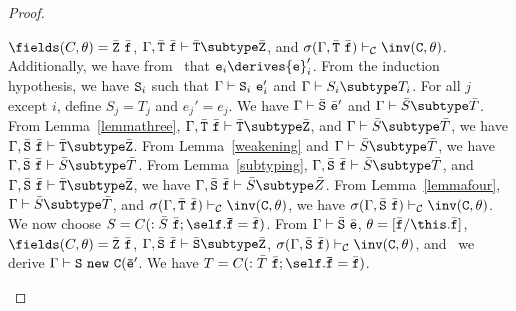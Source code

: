 \begin{proof}
\begin{itemize}
\begin{itemize}
            $\fields(C,\theta)=\bar{\tt Z}\ \bar{\tt f}$,
            $\Gamma, \bar{\tt T}\ \bar{\tt f} \vdash 
                    \bar{\tt T} \subtype \bar{\tt Z}$, and 
            $\sigma(\Gamma, \bar{\tt T}\ \bar{\tt f}) \vdash_{\cal C} 
                    \inv({\tt C},\theta)$.
            Additionally, we have from \RCNewArg\ that
            ${\tt e}_i \derives {{\tt e}}_i'$.
            From the induction hypothesis, we have ${\tt S}_i$ such that
            $\Gamma \vdash {\tt S}_i\ {{\tt e}}_i'$ and 
            $\Gamma \vdash S_i \subtype T_i$.
            For all $j$ except $i$, define $S_j = T_j$ and $e_j' = e_j$.
            We have 
            $\Gamma \vdash \bar{\tt S}\ \bar{\tt e}'$ and
            $\Gamma \vdash \bar{S} \subtype \bar{T}$.
            From Lemma~\ref{lemmathree},
            $\Gamma, \bar{\tt T}\ \bar{\tt f} \vdash
                    \bar{\tt T} \subtype \bar{\tt Z}$,
            and $\Gamma \vdash \bar{S} \subtype \bar{T}$, we have
            $\Gamma, \bar{\tt S}\ \bar{\tt f} \vdash
                    \bar{\tt T} \subtype \bar{\tt Z}$.
            From Lemma~\ref{weakening} and 
            $\Gamma \vdash \bar{S} \subtype \bar{T}$, 
            we have 
            $\Gamma, \bar{\tt S}\ \bar{\tt f} \vdash \bar{S} \subtype \bar{T}$.
            From Lemma~\ref{subtyping},
            $\Gamma, \bar{\tt S}\ \bar{\tt f} \vdash \bar{S} \subtype \bar{T}$,
            and
            $\Gamma, \bar{\tt S}\ \bar{\tt f} \vdash
                    \bar{\tt T} \subtype \bar{\tt Z}$, we have
            $\Gamma, \bar{\tt S}\ \bar{\tt f} \vdash \bar{S} \subtype \bar{Z}$.
            From Lemma~\ref{lemmafour}, 
            $\Gamma \vdash \bar{S} \subtype \bar{T}$, and
            $\sigma(\Gamma, \bar{\tt T}\ \bar{\tt f}) \vdash_{\cal C}
                    \inv({\tt C},\theta)$, 
            we have
            $\sigma(\Gamma, \bar{\tt S}\ \bar{\tt f}) \vdash_{\cal C}
                    \inv({\tt C},\theta)$.
            We now choose 
               $S=C(:\bar{S}\ \bar{\tt f}{\tt ;\self.\bar{f}}=\bar{\tt f})$.
            From 
            $\Gamma \vdash \bar{\tt S}\ \bar{\tt e}$,
            $\theta=[\bar{\tt f}/\this.\bar{\tt f}]$,
            $\fields(C,\theta)=\bar{\tt Z}\ \bar{\tt f}$,
            $\Gamma, \bar{\tt S}\ \bar{\tt f} \vdash
                    \bar{\tt S} \subtype \bar{\tt Z}$,
            $\sigma(\Gamma, \bar{\tt S}\ \bar{\tt f}) \vdash_{\cal C}
                    \inv({\tt C},\theta)$, and \TNew\ we derive
            $\Gamma \vdash {\tt S}\ {\tt new\ C(\bar{e}'}$.
            We have 
               $T=C(:\bar{T}\ \bar{\tt f}{\tt ;\self.\bar{f}}=\bar{\tt f})$.

\end{itemize}
\end{itemize}
\end{proof}
